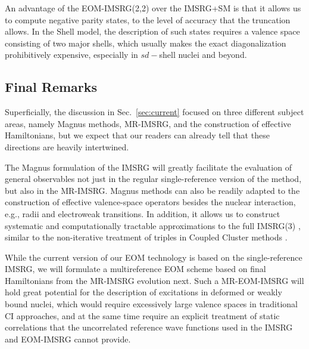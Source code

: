 {An advantage of the EOM-IMSRG(2,2) over the IMSRG+SM is that
it allows us to compute negative parity states, to the level of accuracy
that the truncation allows. In the Shell model, the description of such
states requires a valence space consisting of two major shells, which 
usually makes the exact diagonalization prohibitively expensive, especially
in $sd-$shell nuclei and beyond.


\subsection{\label{sec:current_remarks}Final Remarks}
Superficially, the discussion in Sec.~\ref{sec:current} focused on 
three different subject areas, namely Magnus methods, MR-IMSRG, and the 
construction of effective Hamiltonians, but we expect that our readers
can already tell that these directions are heavily intertwined. 

The Magnus formulation of the IMSRG will greatly facilitate the evaluation 
of general observables not just in the regular single-reference version of
the method, but also in the MR-IMSRG. Magnus methods can also be readily 
adapted to the construction of effective valence-space operators besides 
the nuclear interaction, e.g., radii and electroweak transitions. In addition, 
it allows us to construct systematic and computationally tractable approximations 
to the full IMSRG(3) \cite{Morris:2016xp,Parzuchowski:2016pi}, similar to 
the non-iterative treatment of triples in Coupled Cluster methods 
\cite{Taube:2008kx,Taube:2008vn,Piecuch:2005dp,Binder:2013fk}.

While the current version of our EOM technology is based on the single-reference
IMSRG, we will formulate a multireference EOM scheme based on final 
Hamiltonians from the MR-IMSRG evolution next. Such a MR-EOM-IMSRG
will hold great potential for the description of excitations in 
deformed or weakly bound nuclei, which would require excessively 
large valence spaces in traditional CI approaches, and at the same
time require an explicit treatment of static correlations that the
uncorrelated reference wave functions used in the IMSRG and EOM-IMSRG
cannot provide. 

}
